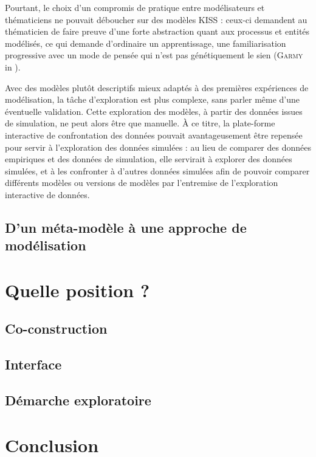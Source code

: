 Pourtant, le choix d'un compromis de pratique entre modélisateurs et thématiciens ne pouvait déboucher sur des modèles KISS : ceux-ci demandent au thématicien de faire preuve d'une forte abstraction quant aux processus et entités modélisés, ce qui demande d'ordinaire \og un apprentissage, une familiarisation progressive avec un mode de pensée qui n’est pas génétiquement le sien\fg{} (\textsc{Garmy} in \cite[477]{ouriachi_lelaboration_2017}).

Avec des modèles plutôt descriptifs mieux adaptés à des premières expériences de modélisation, la tâche d'exploration est plus complexe, sans parler même d'une éventuelle validation.
Cette exploration des modèles, à partir des données issues de simulation, ne peut alors être que manuelle.
À ce titre, la plate-forme interactive de confrontation des données pouvait avantageusement être repensée pour servir à l'exploration des données simulées : au lieu de comparer des données empiriques et des données de simulation, elle servirait à explorer des données simulées, et à les confronter à d'autres données simulées afin de pouvoir comparer différents modèles ou versions de modèles par l'entremise de l'exploration interactive de données.

\subsection{D'un méta-modèle à une approche de modélisation}

\section{Quelle position ?}

\subsection{Co-construction}

\subsection{Interface}

\subsection{Démarche exploratoire}

\section*{Conclusion}
